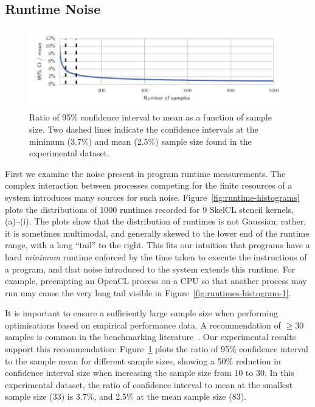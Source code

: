 \documentclass[nonatbib,preprint,nocopyrightspace,9pt]{sigplanconf}
\begin{document}
\subsection{Runtime Noise}

\begin{figure}
\centering
\includegraphics[width=\columnwidth]{img/ci_trend}
\caption[Confidence interval size vs.\ sample count]{%
  Ratio of 95\% confidence interval to mean as a function of sample
  size. Two dashed lines indicate the confidence intervals at the
  minimum (3.7\%) and mean (2.5\%) sample size found in the
  experimental dataset.%
}
\label{fig:ci-trends}
\end{figure}

First we examine the noise present in program runtime
measurements. The complex interaction between processes competing for
the finite resources of a system introduces many sources for such
noise. Figure~\ref{fig:runtime-histograms} plots the distributions of
1000 runtimes recorded for 9 SkelCL stencil kernels, (a)--(i). The
plots show that the distribution of runtimes is not Gaussian; rather,
it is sometimes multimodal, and generally skewed to the lower end of
the runtime range, with a long ``tail'' to the right. This fits our
intuition that programs have a hard \emph{minimum} runtime enforced by
the time taken to execute the instructions of a program, and that
noise introduced to the system extends this runtime. For example,
preempting an OpenCL process on a CPU so that another process may run
may cause the very long tail visible in
Figure~\ref{fig:runtimes-histogram-1}.

It is important to ensure a sufficiently large sample size when
performing optimisations based on empirical performance data. A
recommendation of $\ge 30$ samples is common in the benchmarking
literature~\cite{Georges2007}. Our experimental results support this
recommendation: Figure~\ref{fig:ci-trends} plots the ratio of 95\%
confidence interval to the sample mean for different sample sizes,
showing a 50\% reduction in confidence interval size when increasing
the sample size from 10 to 30. In this experimental dataset, the ratio
of confidence interval to mean at the smallest sample size (33) is
3.7\%, and 2.5\% at the mean sample size (83).
\end{document}
